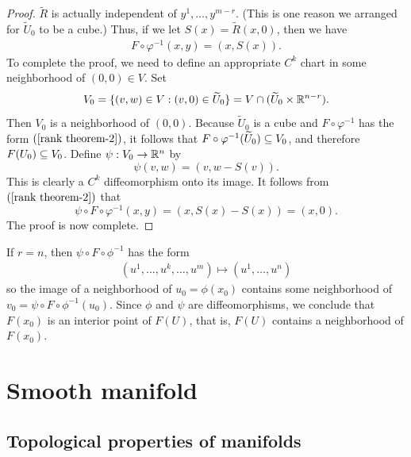 \begin{proof}
$\widetilde{R}$ is actually independent of $y^1,\dots,y^{m-r}$. (This is one reason we arranged for $\widetilde{U}_0$ to be a cube.) Thus, if we let 
$S(x)=\widetilde{R}(x,0)$, then we have
\begin{align}\label{rank theorem-2}
F\circ\varphi^{-1}(x,y)=(x,S(x)).
\end{align}
To complete the proof, we need to define an appropriate $C^k$ chart in some neighborhood of $(0,0)\in V$. Set
\[V_0=\{(v,w)\in V:(v,0)\in\widetilde{U}_0\}=V\cap(\widetilde{U}_0\times\mathbb{R}^{n-r}).\]
Then $V_0$ is a neighborhood of $(0,0)$. Because $\widetilde{U}_0$ is a cube and $F\circ\varphi^{-1}$ has the form $(\ref{rank theorem-2})$, it follows that 
$F\circ\varphi^{-1}(\widetilde{U}_0)\subseteq V_0$, and therefore $F(U_0)\subseteq V_0$. Define $\psi:V_0\to\mathbb{R}^n$ by
\[\psi(v,w)=(v,w-S(v)).\]
This is clearly a $C^k$ diffeomorphism onto its image. It follows from $(\ref{rank theorem-2})$ that
\[\psi\circ F\circ\varphi^{-1}(x,y)=(x,S(x)-S(x))=(x,0).\]
The proof is now complete.
\end{proof}
\begin{remark}
If $r=n$, then $\psi\circ F\circ\phi^{-1}$ has the form
\begin{align*}
(u^1,\dots,u^k,\dots,u^m)\mapsto(u^1,\dots,u^n)
\end{align*}
so the image of a neighborhood of $u_0=\phi(x_0)$ contains some neighborhood of $v_0=\psi\circ F\circ\phi^{-1}(u_0)$. Since $\phi$ and $\psi$ are diffeomorphisms, we conclude that $F(x_0)$ is an interior point of $F(U)$, that is, $F(U)$ contains a neighborhood of $F(x_0)$.
\end{remark}
\chapter{Smooth manifold}
\section{Topological properties of manifolds}
